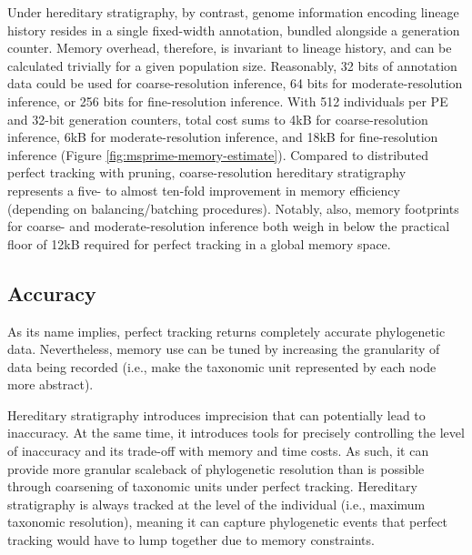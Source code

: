 Under hereditary stratigraphy, by contrast, genome information encoding lineage history resides in a single fixed-width annotation, bundled alongside a generation counter.
Memory overhead, therefore, is invariant to lineage history, and can be calculated trivially for a given population size.
Reasonably, 32 bits of annotation data could be used for coarse-resolution inference, 64 bits for moderate-resolution inference, or 256 bits for fine-resolution inference.
With 512 individuals per PE and 32-bit generation counters, total cost sums to 4kB for coarse-resolution inference, 6kB for moderate-resolution inference, and 18kB for fine-resolution inference (Figure \ref{fig:msprime-memory-estimate}).
Compared to distributed perfect tracking with pruning, coarse-resolution hereditary stratigraphy represents a five- to almost ten-fold improvement in memory efficiency (depending on balancing/batching procedures).
Notably, also, memory footprints for coarse- and moderate-resolution inference both weigh in below the practical floor of 12kB required for perfect tracking in a global memory space.





\subsection{Accuracy}

As its name implies, perfect tracking returns completely accurate phylogenetic data.
Nevertheless, memory use can be tuned by increasing the granularity of data being recorded (i.e., make the taxonomic unit represented by each node more abstract).

Hereditary stratigraphy introduces imprecision that can potentially lead to inaccuracy.
At the same time, it introduces tools for precisely controlling the level of inaccuracy and its trade-off with memory and time costs.
As such, it can provide more granular scaleback of phylogenetic resolution than is possible through coarsening of taxonomic units under perfect tracking.
Hereditary stratigraphy is always tracked at the level of the individual (i.e., maximum taxonomic resolution), meaning it can capture phylogenetic events that perfect tracking would have to lump together due to memory constraints.

